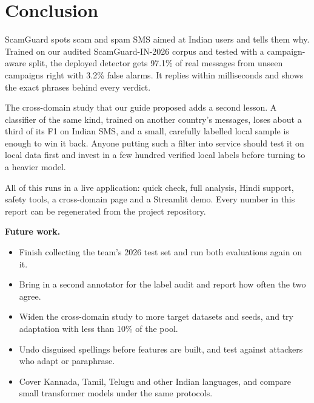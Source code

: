 \chapter{Conclusion}
ScamGuard spots scam and spam SMS aimed at Indian users and tells them why. Trained on our audited ScamGuard-IN-2026 corpus and tested with a campaign-aware split, the deployed detector gets 97.1\% of real messages from unseen campaigns right with 3.2\% false alarms. It replies within milliseconds and shows the exact phrases behind every verdict.

The cross-domain study that our guide proposed adds a second lesson. A classifier of the same kind, trained on another country's messages, loses about a third of its F1 on Indian SMS, and a small, carefully labelled local sample is enough to win it back. Anyone putting such a filter into service should test it on local data first and invest in a few hundred verified local labels before turning to a heavier model.

All of this runs in a live application: quick check, full analysis, Hindi support, safety tools, a cross-domain page and a Streamlit demo. Every number in this report can be regenerated from the project repository.

\textbf{Future work.}
\begin{itemize}
\item Finish collecting the team's 2026 test set and run both evaluations again on it.
\item Bring in a second annotator for the label audit and report how often the two agree.
\item Widen the cross-domain study to more target datasets and seeds, and try adaptation with less than 10\% of the pool.
\item Undo disguised spellings before features are built, and test against attackers who adapt or paraphrase.
\item Cover Kannada, Tamil, Telugu and other Indian languages, and compare small transformer models under the same protocols.
\end{itemize}
